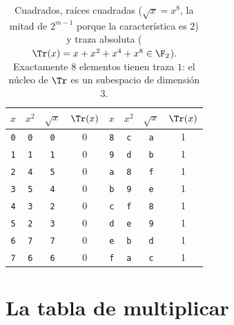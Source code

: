 \begin{table}[htbp]
\centering
\begin{tabular}{@{}cccc@{\hspace{3em}}cccc@{}}
\toprule
$x$ & $x^2$ & $\sqrt{x}$ & $\Tr(x)$ & $x$ & $x^2$ & $\sqrt{x}$ & $\Tr(x)$\\
\midrule
\texttt{0} & \texttt{0} & \texttt{0} & 0 & \texttt{8} & \texttt{c} & \texttt{a} & 1\\
\texttt{1} & \texttt{1} & \texttt{1} & 0 & \texttt{9} & \texttt{d} & \texttt{b} & 1\\
\texttt{2} & \texttt{4} & \texttt{5} & 0 & \texttt{a} & \texttt{8} & \texttt{f} & 1\\
\texttt{3} & \texttt{5} & \texttt{4} & 0 & \texttt{b} & \texttt{9} & \texttt{e} & 1\\
\texttt{4} & \texttt{3} & \texttt{2} & 0 & \texttt{c} & \texttt{f} & \texttt{8} & 1\\
\texttt{5} & \texttt{2} & \texttt{3} & 0 & \texttt{d} & \texttt{e} & \texttt{9} & 1\\
\texttt{6} & \texttt{7} & \texttt{7} & 0 & \texttt{e} & \texttt{b} & \texttt{d} & 1\\
\texttt{7} & \texttt{6} & \texttt{6} & 0 & \texttt{f} & \texttt{a} & \texttt{c} & 1\\
\bottomrule
\end{tabular}
\caption{Cuadrados, raíces cuadradas ($\sqrt{x}=x^{8}$, la mitad de
$2^{m-1}$ porque la característica es $2$) y traza absoluta
($\Tr(x)=x+x^2+x^4+x^8\in\F_2$). Exactamente $8$ elementos tienen
traza $1$: el núcleo de $\Tr$ es un subespacio de dimensión $3$.}
\end{table}

\section{La tabla de multiplicar}

